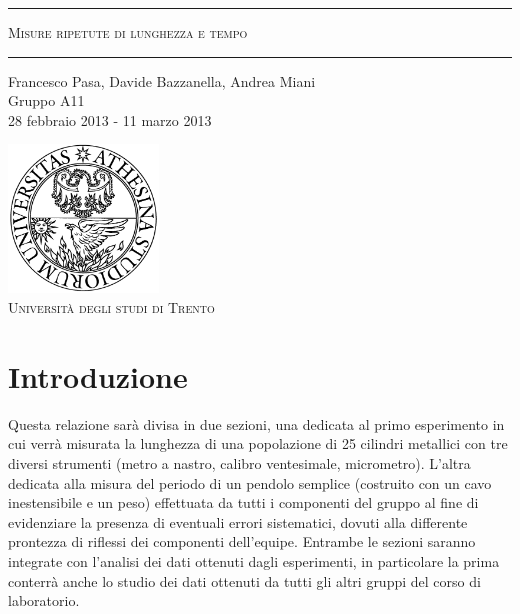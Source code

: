 \begin{titlepage}
\begin{center}

	\hrule \vspace{0.5cm}
     	\textsc{\LARGE Misure ripetute di lunghezza e tempo}
	\vspace{0.5cm} \hrule \vspace{2cm}
      	{\large Francesco Pasa, Davide Bazzanella, Andrea Miani\\
		Gruppo A11}\\
	\vspace{0.5cm}
      	{\large 28 febbraio 2013 - 11 marzo 2013}

	\vfill

    \includegraphics[width=4cm]{unitn_logo.png}\\
    \vspace{1cm}
        \textsc{\Large Università degli studi di Trento}

    \vfill 

	{\begin{abstract}
Misura della lunghezza di un gruppo di 25 cilindri di metallo e della durata del periodo di oscillazione di un pendolo semplice.
Analisi dei valori ottenuti dagli esperimenti del singolo gruppo e dei valori raccolti dagli esperimenti di tutti i gruppi di laboratorio.
	 \end{abstract}}
\end{center}
\end{titlepage}

\newpage

\vspace*{\fill}
\begin{center}
	\tableofcontents
\end{center}
\vspace*{\fill}

\newpage

\section{Introduzione}
Questa relazione sarà divisa in due sezioni, una dedicata al primo esperimento
in cui verrà misurata la lunghezza di una popolazione di 25 cilindri metallici
con tre diversi strumenti (metro a nastro, calibro ventesimale, micrometro).
L'altra dedicata alla misura del periodo di un pendolo semplice (costruito con
un cavo inestensibile e un peso) effettuata da tutti i componenti del gruppo
al fine di evidenziare la presenza di eventuali errori sistematici, dovuti
alla differente prontezza di riflessi dei componenti dell'equipe. Entrambe
le sezioni saranno integrate con l'analisi dei dati ottenuti dagli
esperimenti, in particolare la prima conterrà anche lo studio dei dati
ottenuti da tutti gli altri gruppi del corso di laboratorio.

